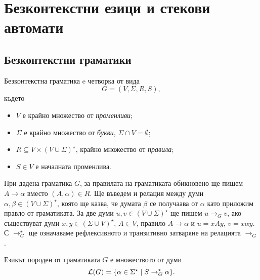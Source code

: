 \chapter{Безконтекстни езици и стекови автомати}


\section{Безконтекстни граматики}

\begin{dfn}
  Безконтекстна граматика e четворка от вида
  \[G = (V,\Sigma,R,S),\]
  където
  \begin{itemize}
  \item
    $V$ е крайно множество от {\em променливи};
  \item
    $\Sigma$ е крайно множество от {\em букви}, $\Sigma \cap V = \emptyset$;
  \item
    $R \subseteq V\times (V\cup\Sigma)^\star$, крайно множество от {\em правила};
  \item
    $S \in V$ е началната променлива. 
  \end{itemize}
\end{dfn}

При дадена граматика $G$, за правилата на граматиката обикновено ще пишем $A \rightarrow \alpha$ вместо $(A,\alpha) \in R$.
Ще въведем и релация между думи $\alpha,\beta\in (V \cup \Sigma)^\star$, която ще казва, че думата $\beta$
се получаава от $\alpha$ като приложим правло от граматиката.
За две думи $u,v\in (V\cup\Sigma)^\star$ ще пишем $u \rightarrow_G v$, ако съществуват думи $x,y\in (\Sigma\cup V)^\star$, $A\in V$,
правило $A\rightarrow \alpha$ и $u = xAy$, $v = x\alpha y$.
С $\rightarrow^\star_G$ ще означаваме рефлексивното и транзитивно затваряне на релацията $\rightarrow_G$.

Езикът породен от граматиката $G$ е множеството от думи
\[\mathcal{L}(G) = \{\alpha\in\Sigma^\star\mid S \rightarrow^\star_G \alpha\}.\]
  

